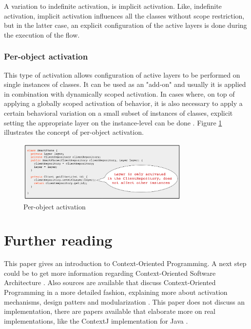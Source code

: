 \documentclass{acm_proc_article-sp}
\begin{document}
A variation to indefinite activation, is implicit activation. Like, indefinite activation, implicit activation influences all the classes without scope restriction, but in the latter case, an explicit configuration of the active layers is done during the execution of the flow. 

\subsubsection{Per-object activation}
\label{per_object_activation}
This type of activation allows configuration of active layers to be performed on single instances of classes. It can be used as an "add-on" and usually it is applied in combination with dynamically scoped activation. In cases where, on top of applying a  globally scoped activation of behavior, it is also necessary to apply a certain behavioral variation on a small subset of instances of classes, explicit setting the appropriate layer on the instance-level can be done \cite{SALVANESCHI20121801}. Figure \ref{fig:per_object_activation} illustrates the concept of per-object activation.

\begin{figure}[H]
\centering
\includegraphics[width=85mm]{per_object_activation2.png}
\caption{Per-object activation}
\label{fig:per_object_activation}
\end{figure}

\section{Further reading}
\label{sec:further_reading}
This paper gives an introduction to Context-Oriented Programming. A next step could be to get more information regarding Context-Oriented Software Architecture \cite{Mens:2016:CSA:2951965.2951971}. Also sources are available that discuss Context-Oriented Programming in a more detailed fashion, explaining more about activation mechanisms, design patters and modularization \cite{SALVANESCHI20121801}. This paper does not discuss an implementation, there are papers available that elaborate more on real implementations, like the ContextJ implementation for Java \cite{Appeltauer:2009:IDC:1562112.1562117}. 
\end{document}
